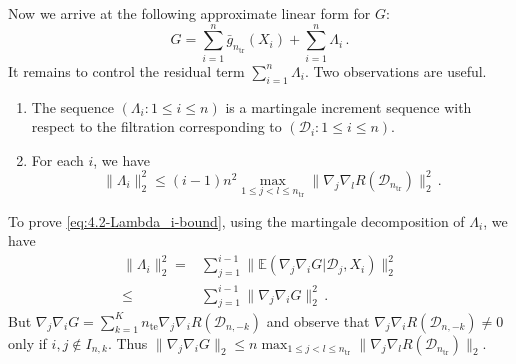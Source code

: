 \documentclass[11pt]{article}
\theoremstyle{plain}
\newcommand{\tr}{{\mathrm{tr}}}
\newcommand{\te}{{\mathrm{te}}}
\newcommand{\D}{{\mathcal{D}}}
\begin{document}
Now we arrive at the following approximate linear form for $G$:
\begin{equation}\label{eq:4.2-approx-G-with-res}
    G = \sum_{i=1}^n \bar g_{n_\tr}(X_i)+\sum_{i=1}^n \Lambda_i\,.
\end{equation}
It remains to control the residual term $\sum_{i=1}^n \Lambda_i$.  Two observations are useful.
\begin{enumerate}
    \item The sequence $(\Lambda_i:1\le i\le n)$ is a martingale increment sequence with respect to the filtration corresponding to $(\D_i:1\le i\le n)$.
    \item For each $i$, we have
    \begin{equation}
        \label{eq:4.2-Lambda_i-bound}
        \|\Lambda_i\|_2^2\le (i-1)n^2 \max_{1\le j< l\le n_\tr} \|\nabla_j\nabla_l R(\D_{n_\tr})\|_2^2\,.
    \end{equation}
\end{enumerate}
To prove \eqref{eq:4.2-Lambda_i-bound}, using the martingale decomposition of $\Lambda_i$, we have
\begin{align*}
    \|\Lambda_i\|_2^2  = & \sum_{j=1}^{i-1}\|\mathbb E(\nabla_j\nabla_i G|\D_j,X_i)\|_2^2\\
    \le & \sum_{j=1}^{i-1} \|\nabla_j\nabla_i G\|_2^2\,.
\end{align*}
But $\nabla_j\nabla_i G = \sum_{k=1}^K n_\te \nabla_j\nabla_i R(\D_{n,-k})$ and observe that $\nabla_j\nabla_i R(\D_{n,-k})\neq 0$ only if $i,j\notin I_{n,k}$.  Thus $\|\nabla_j\nabla_i G\|_2\le n\max_{1\le j<l\le n_\tr}\|\nabla_j\nabla_l R(\D_{n_\tr})\|_2$.
\end{document}
